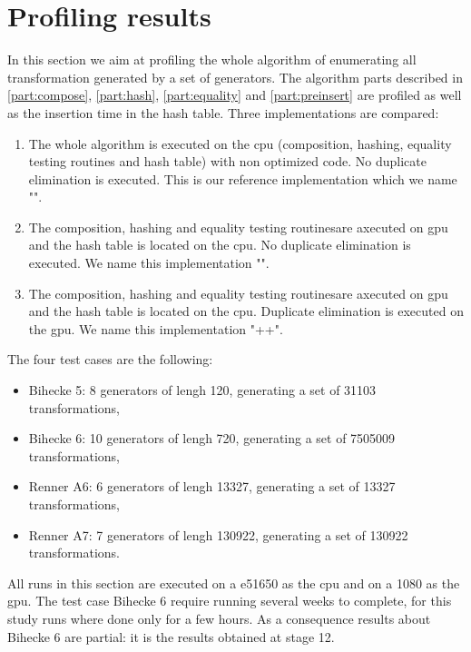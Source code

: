 {\section{Profiling results}
\label{part:results}
In this section we aim at profiling the whole algorithm of enumerating all transformation generated by a set of generators. 
The algorithm parts described in \autoref{part:compose}, \autoref{part:hash}, \autoref{part:equality} and \autoref{part:preinsert} are profiled as well as the insertion time in the hash table.
Three implementations are compared:
\begin{enumerate}
\item The whole algorithm is executed on the \gls{cpu} (composition, hashing, equality testing routines and hash table) with non optimized code. No duplicate elimination is executed.
This is our reference implementation which we name "". 
\item The composition, hashing and equality testing routinesare axecuted on \gls{gpu} and the hash table is located on the \gls{cpu}. No duplicate elimination is executed.
We name this implementation "".
\item The composition, hashing and equality testing routinesare axecuted on \gls{gpu} and the hash table is located on the \gls{cpu}. Duplicate elimination is executed on the \gls{gpu}.
We name this implementation "++".
\end{enumerate}
The four test cases are the following:
\begin{itemize}
\item Bihecke 5: 8 generators of lengh 120, generating a set of 31103 transformations,
\item Bihecke 6: 10 generators of lengh 720, generating a set of 7505009 transformations,
\item Renner A6: 6 generators of lengh 13327, generating a set of 13327 transformations,
\item Renner A7: 7 generators of lengh 130922, generating a set of 130922 transformations.
\end{itemize}


All runs in this section are executed on a \gls{e51650} as the \gls{cpu} and on a \gls{1080} as the \gls{gpu}.
The test case Bihecke 6 require running several weeks to complete, for this study runs where done only for a few hours.
As a consequence results about Bihecke 6 are partial: it is the results obtained at stage 12.


}
